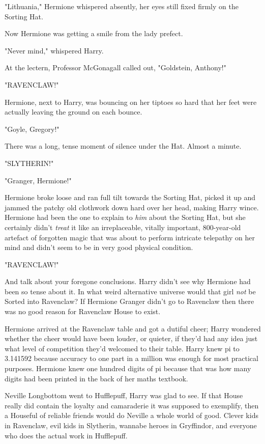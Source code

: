 "Lithuania," Hermione whispered absently, her eyes still fixed firmly on the
Sorting Hat.

Now Hermione was getting a smile from the lady prefect.

"Never mind," whispered Harry.

At the lectern, Professor McGonagall called out, "Goldstein, Anthony!"

"RAVENCLAW!"

Hermione, next to Harry, was bouncing on her tiptoes so hard that her feet were
actually leaving the ground on each bounce.

"Goyle, Gregory!"

There was a long, tense moment of silence under the Hat. Almost a minute.

"SLYTHERIN!"

"Granger, Hermione!"

Hermione broke loose and ran full tilt towards the Sorting Hat, picked it up
and jammed the patchy old clothwork down hard over her head, making Harry
wince. Hermione had been the one to explain to \emph{him} about the Sorting
Hat, but she certainly didn't \emph{treat} it like an irreplaceable, vitally
important, 800-year-old artefact of forgotten magic that was about to perform
intricate telepathy on her mind and didn't seem to be in very good physical
condition.

"RAVENCLAW!"

And talk about your foregone conclusions. Harry didn't see why Hermione had
been so tense about it. In what weird alternative universe would that girl
\emph{not} be Sorted into Ravenclaw? If Hermione Granger didn't go to Ravenclaw
then there was no good reason for Ravenclaw House to exist.

Hermione arrived at the Ravenclaw table and got a dutiful cheer; Harry wondered
whether the cheer would have been louder, or quieter, if they'd had any idea
just what level of competition they'd welcomed to their table. Harry knew pi to
3.141592 because accuracy to one part in a million was enough for most
practical purposes. Hermione knew one hundred digits of pi because that was how
many digits had been printed in the back of her maths textbook.

Neville Longbottom went to Hufflepuff, Harry was glad to see. If that House
really did contain the loyalty and camaraderie it was supposed to exemplify,
then a Houseful of reliable friends would do Neville a whole world of good.
Clever kids in Ravenclaw, evil kids in Slytherin, wannabe heroes in Gryffindor,
and everyone who does the actual work in Hufflepuff.

